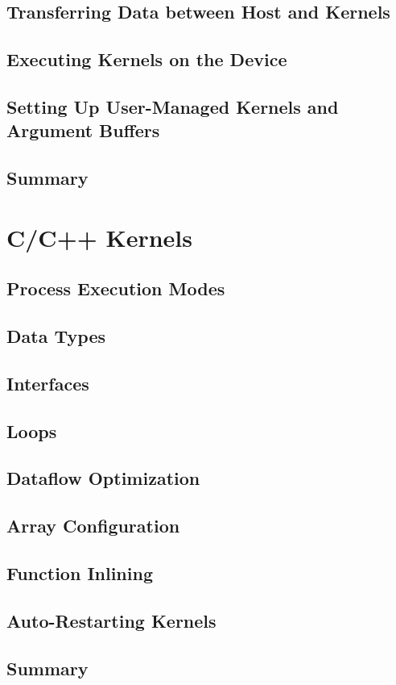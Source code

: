 \subsection{Transferring Data between Host and Kernels}
\subsection{Executing Kernels on the Device}
\subsection{Setting Up User-Managed Kernels and Argument Buffers}
\subsection{Summary}


\section{C/C++ Kernels}
\subsection{Process Execution Modes}
\subsection{Data Types}
\subsection{Interfaces}
\subsection{Loops}
\subsection{Dataflow Optimization}
\subsection{Array Configuration}
\subsection{Function Inlining}
\subsection{Auto-Restarting Kernels}
\subsection{Summary}



